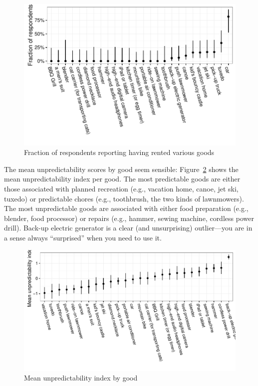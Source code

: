 \documentclass[11pt]{article}
\begin{document}
\begin{figure}
\centering 
\caption{Fraction of respondents reporting having rented various goods \label{fig:frac_renting}}
\begin{minipage}{0.90 \linewidth}
\includegraphics[width = \linewidth]{./plots/rental_fractions.pdf} 
\end{minipage} 
\end{figure} 

The mean unpredictability scores by good seem sensible: 
Figure~\ref{fig:predict_index} shows the mean unpredictability index per good. 
The most predictable goods are either those associated with planned recreation (e.g., vacation home, canoe, jet ski, tuxedo) or predictable chores (e.g., toothbrush, the two kinds of lawnmowers). 
The most unpredictable goods are associated with either food preparation (e.g., blender, food processor) or repairs (e.g., hammer, sewing machine, cordless power drill). 
Back-up electric generator is a clear (and unsurprising) outlier---you are in a sense always ``surprised'' when you need to use it. 


\begin{figure}
\centering 
\caption{Mean unpredictability index by good \label{fig:predict_index} }
\begin{minipage}{0.90 \linewidth}
\includegraphics[width = \linewidth]{./plots/predictability.pdf} 
\end{minipage} 
\end{figure} 
\end{document}

